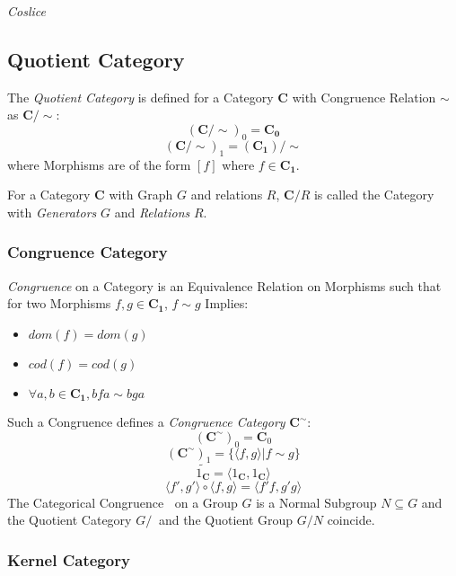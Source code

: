\emph{Coslice}



\subsection{Quotient Category}\label{sec:quotient_category}


The \emph{Quotient Category} is defined for a Category $\mathbf{C}$
with Congruence Relation $\sim$ as $\mathbf{C}/\sim$:
\[
  (\mathbf{C}/\sim)_0 = \mathbf{C_0}
\]\[
  (\mathbf{C}/\sim)_1 = (\mathbf{C_1})/\sim
\]
where Morphisms are of the form $[f]$ where $f \in \mathbf{C_1}$.

For a Category $\mathbf{C}$ with Graph $G$ and relations $R$,
$\mathbf{C}/R$ is called the Category with \emph{Generators} $G$ and
\emph{Relations} $R$.



\subsubsection{Congruence Category}\label{sec:congruence_category}

\emph{Congruence} on a Category is an Equivalence Relation on
Morphisms such that for two Morphisms $f,g \in \mathbf{C_1}$, $f \sim
g$ Implies:
\begin{itemize}
  \item $dom(f) = dom(g)$
  \item $cod(f) = cod(g)$
  \item $\forall a,b \in \mathbf{C_1}, bfa \sim bga$
\end{itemize}
Such a Congruence defines a \emph{Congruence Category}
$\mathbf{C^{\sim}}$:
\[
  (\mathbf{C^{\sim}})_0 = \mathbf{C}_0
\]\[
  (\mathbf{C^{\sim}})_1 = \{\langle f,g \rangle | f \sim g\}
\]\[
  \tilde{1_\mathbf{C}} = \langle 1_\mathbf{C}, 1_\mathbf{C} \rangle
\]\[
  \langle f',g' \rangle \circ \langle f,g \rangle = \langle f'f,g'g \rangle
\]
The Categorical Congruence $~$ on a Group $G$ is a Normal Subgroup $N
\subseteq G$ and the Quotient Category $G/~$ and the Quotient Group
$G/N$ coincide. \cite{awodey06}



\subsubsection{Kernel Category}\label{sec:kernel_category}

